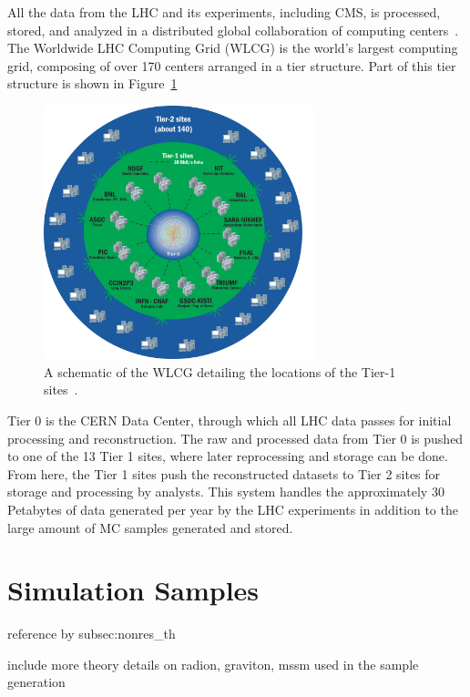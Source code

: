 All the data from the LHC and its experiments, including CMS, is processed, stored, and analyzed
in a distributed global collaboration of computing centers~\cite{Eck:840543}. The Worldwide
LHC Computing Grid (WLCG) is the world's largest computing grid, composing of over 170 centers
arranged in a tier structure. Part of this tier structure is shown in Figure~\ref{fig:cerncomputing}

\begin{figure}[ht]
 \begin{center}
    \includegraphics[width=0.70\textwidth]{figures/data/CCApr13-Tiers0-1-2_PNG-file.png}
      \end{center}
\caption{A schematic of the WLCG detailing the locations of the Tier-1 sites~\cite{cern:computing}.}
\label{fig:cerncomputing}
\end{figure}

Tier 0 is the CERN Data Center, through which all LHC data passes for initial processing and
reconstruction. The raw and processed data from Tier 0 is pushed to one of the 13 Tier 1 sites, where
later reprocessing and storage can be done. From here, the Tier 1 sites push the reconstructed
datasets to Tier 2 sites for storage and processing by analysts. This system handles the approximately
30 Petabytes of data generated per year by the LHC experiments in addition to the large amount of
MC samples generated and stored.

\section{Simulation Samples\label{sec:sim}}

reference by subsec:nonres\_th

include more theory details on radion, graviton, mssm used in the sample generation
